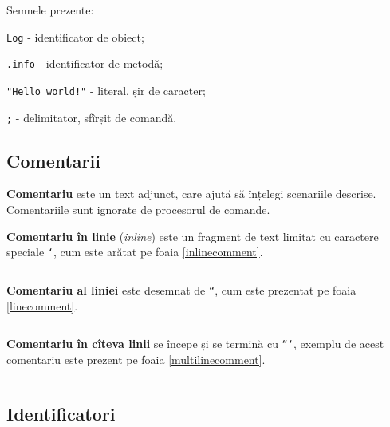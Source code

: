 Semnele prezente:
\begin{icItems}
\item
	\texttt{Log} - identificator de obiect;
\item
	\texttt{.info} - identificator de metodă;
\item
	\texttt{"Hello world!"} - literal, șir de caracter;
\item
	\texttt{;} - delimitator, sfîrșit de comandă.
\end{icItems}

\subsection{Comentarii}

\textbf{Comentariu} este un text adjunct, care ajută să înțelegi scenariile descrise. Comentariile sunt ignorate de procesorul de comande.

\textbf{Comentariu în linie} (\textit{inline}) este un fragment de text limitat cu caractere speciale \texttt{`}, cum este arătat pe foaia \ref{inlinecomment}.

\begin{listing}
    \label{inlinecomment}
    \inputminted[linenos]{icl}{../sources/inlinecomment.icL}
\end{listing}

\textbf{Comentariu al liniei} este desemnat de \texttt{``}, cum este prezentat pe foaia \ref{linecomment}.

\begin{listing}
    \label{linecomment}
    \inputminted[linenos]{icl}{../sources/linecomment.icL}
\end{listing}

\textbf{Comentariu în cîteva linii} se începe și se termină cu \texttt{```}, exemplu de acest comentariu este prezent pe foaia \ref{multilinecomment}.

\begin{listing}
    \label{multilinecomment}
    \inputminted[linenos]{icl}{../sources/multilinecomment.icL}
\end{listing}

\subsection{Identificatori}


